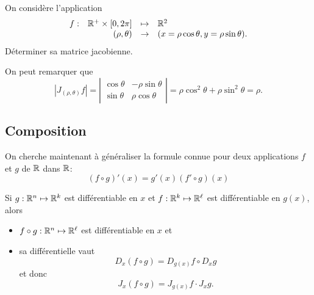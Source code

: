 \begin{exercise*}
  On considère l'application
  $$
  \begin{array}{rrcl}
    f : & \mathbb{R}^+ \times [0, 2\pi] & \mapsto & \mathbb{R}^2 \\
    & (\rho, \theta) & \rightarrow & (x = \rho \cos \theta, y = \rho \sin \theta).
  \end{array}
  $$
  Déterminer sa matrice jacobienne. 
\end{exercise*}


\remark
On peut remarquer que 
$$
|J_{(\rho, \theta)}f| 
= \left| \begin{array}{cc}
    \cos \theta  & -\rho \sin \theta  \\
    \sin \theta  & \rho \cos \theta  
  \end{array} \right|
= \rho \cos^2\theta + \rho \sin^2 \theta = \rho.
$$

\subsection{Composition} 

On cherche maintenant à généraliser la formule connue pour deux applications $f$ et $g$ de $\mathbb{R}$ dans $\mathbb{R}$:
$$
(f \circ g)'(x) = g'(x) (f' \circ g)(x)
$$

\begin{proposition*}
  Si $g : \mathbb{R}^n \mapsto \mathbb{R}^k$ est différentiable en $x$ et $f : \mathbb{R}^k \mapsto \mathbb{R}^\ell$ est différentiable en $g(x)$, alors
  \begin{itemize}
   \item $f \circ g: \mathbb{R}^n \mapsto \mathbb{R}^\ell$ est différentiable en $x$ et
   \item sa différentielle vaut
   $$
   D_x(f \circ g) = D_{g(x)}f \circ D_xg
   $$
   et donc
   $$
   J_x(f \circ g) = J_{g(x)}f \cdot J_xg.
   $$
  \end{itemize}
\end{proposition*}

